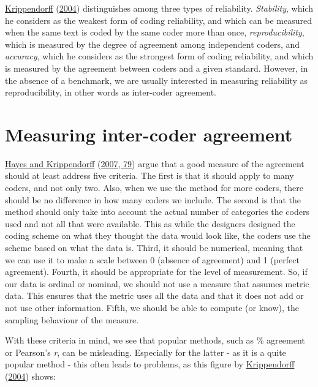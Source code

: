 \documentclass[
]{book}
\begin{document}
\protect\hyperlink{ref-Krippendorff2004a}{Krippendorff} (\protect\hyperlink{ref-Krippendorff2004a}{2004}) distinguishes among three types of reliability. \emph{Stability}, which he considers as the weakest form of coding reliability, and which can be measured when the same text is coded by the same coder more than once, \emph{reproducibility}, which is measured by the degree of agreement among independent coders, and \emph{accuracy}, which he considers as the strongest form of coding reliability, and which is measured by the agreement between coders and a given standard. However, in the absence of a benchmark, we are usually interested in measuring reliability as reproducibility, in other words as inter-coder agreement.

\hypertarget{measuring-inter-coder-agreement}{%
\section{Measuring inter-coder agreement}\label{measuring-inter-coder-agreement}}

\protect\hyperlink{ref-Hayes2007a}{Hayes and Krippendorff} (\protect\hyperlink{ref-Hayes2007a}{2007, 79}) argue that a good measure of the agreement should at least address five criteria. The first is that it should apply to many coders, and not only two. Also, when we use the method for more coders, there should be no difference in how many coders we include. The second is that the method should only take into account the actual number of categories the coders used and not all that were available. This as while the designers designed the coding scheme on what they thought the data would look like, the coders use the scheme based on what the data is. Third, it should be numerical, meaning that we can use it to make a scale between 0 (absence of agreement) and 1 (perfect agreement). Fourth, it should be appropriate for the level of measurement. So, if our data is ordinal or nominal, we should not use a measure that assumes metric data. This ensures that the metric uses all the data and that it does not add or not use other information. Fifth, we should be able to compute (or know), the sampling behaviour of the measure.

With these criteria in mind, we see that popular methods, such as \% agreement or Pearson's \emph{r}, can be misleading. Especially for the latter - as it is a quite popular method - this often leads to problems, as this figure by \protect\hyperlink{ref-Krippendorff2004a}{Krippendorff} (\protect\hyperlink{ref-Krippendorff2004a}{2004}) shows:
\end{document}
